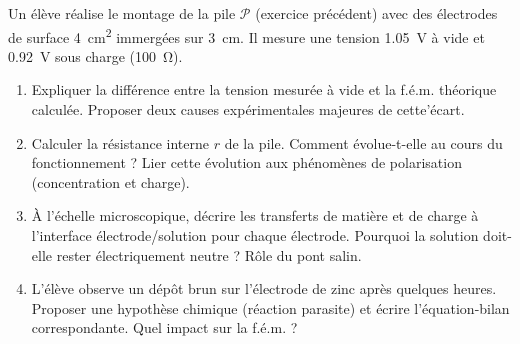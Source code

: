 \documentclass[11pt]{article}
\begin{document}
\begin{exercice}
Un élève réalise le montage de la pile $\mathcal{P}$ (exercice précédent) avec des électrodes de surface \SI{4}{cm^2} immergées sur \SI{3}{cm}. Il mesure une tension \SI{1,05}{V} à vide et \SI{0,92}{V} sous charge (\SI{100}{\ohm}).
\begin{enumerate}
    \item Expliquer la différence entre la tension mesurée à vide et la f.é.m. théorique calculée. Proposer deux causes expérimentales majeures de cette'écart.
    \item Calculer la résistance interne $r$ de la pile. Comment évolue-t-elle au cours du fonctionnement ? Lier cette évolution aux phénomènes de polarisation (concentration et charge).
    \item À l'échelle microscopique, décrire les transferts de matière et de charge à l'interface électrode/solution pour chaque électrode. Pourquoi la solution doit-elle rester électriquement neutre ? Rôle du pont salin.
    \item L'élève observe un dépôt brun sur l'électrode de zinc après quelques heures. Proposer une hypothèse chimique (réaction parasite) et écrire l'équation-bilan correspondante. Quel impact sur la f.é.m. ?
\end{enumerate}
\end{exercice}
\end{document}

